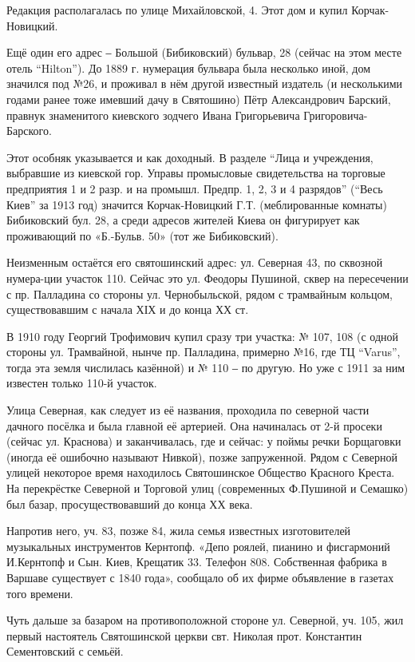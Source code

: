 Редакция располагалась по улице Михайловской, 4. Этот дом и купил
Корчак-Новицкий. 

Ещё один его адрес ‒ Большой (Бибиковский) бульвар, 28 (сейчас на этом месте
отель \enquote{Hilton}). До 1889 г. нумерация бульвара была несколько иной, дом
значился под №26, и проживал в нём другой известный издатель (и несколькими
годами ранее тоже имевший дачу в Святошино) Пётр Александрович Барский, правнук
знаменитого киевского зодчего Ивана Григорьевича Григоровича-Барского.

Этот особняк указывается и как доходный. В разделе \enquote{Лица и учреждения,
выбравшие из киевской гор. Управы промысловые свидетельства на торговые
предприятия 1 и 2 разр. и на промышл. Предпр. 1, 2, 3 и 4 разрядов} (\enquote{Весь
Киев} за 1913 год) значится Корчак-Новицкий Г.Т. (меблированные комнаты)
Бибиковский бул. 28, а среди адресов жителей Киева он фигурирует как
проживающий по «Б.-Бульв. 50» (тот же Бибиковский). 

Неизменным остаётся его святошинский адрес: ул. Северная  43, по сквозной
нумера-ции участок 110. Сейчас это ул. Феодоры Пушиной, сквер на пересечении с
пр. Палладина со стороны ул. Чернобыльской, рядом с трамвайным кольцом,
существовавшим с начала ХІХ и до конца ХХ ст.

В 1910 году Георгий Трофимович купил сразу три участка: № 107, 108 (с одной
стороны ул. Трамвайной, нынче пр. Палладина, примерно №16, где ТЦ “Varus”,
тогда эта земля числилась казённой) и № 110 ‒ по другую. Но уже с 1911 за ним
известен только 110-й участок.

Улица Северная, как следует из её названия, проходила по северной части дачного
посёлка и была главной её артерией. Она начиналась от 2-й просеки (сейчас ул.
Краснова) и заканчивалась, где и сейчас: у поймы речки Борщаговки (иногда её
ошибочно называют Нивкой), позже запруженной. Рядом с Северной улицей некоторое
время находилось Святошинское Общество Красного Креста. На перекрёстке Северной
и Торговой улиц (современных Ф.Пушиной и Семашко) был базар, просуществовавший
до конца ХХ века. 

Напротив него, уч. 83, позже 84, жила семья известных изготовителей музыкальных
инструментов Кернтопф. «Депо роялей, пианино и фисгармоний И.Кернтопф и Сын.
Киев, Крещатик 33. Телефон 808. Собственная фабрика в Варшаве существует с 1840
года», сообщало об их фирме объявление в газетах того времени. 

Чуть дальше за базаром на противоположной стороне ул. Северной, уч. 105, жил
первый настоятель Святошинской церкви свт. Николая прот. Константин
Сементовский с семьёй.


